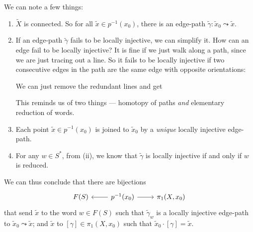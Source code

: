 \documentclass[a4paper]{article}
\begin{document}
We can note a few things:
\begin{enumerate}
  \item $\tilde{X}$ is connected. So for all $\tilde{x} \in p^{-1}(x_0)$, there is an edge-path $\tilde{\gamma}: \tilde{x}_0 \leadsto \tilde{x}$.
  \item If an edge-path $\tilde{\gamma}$ fails to be locally injective, we can simplify it. How can an edge fail to be locally injective? It is fine if we just walk along a path, since we are just tracing out a line. So it fails to be locally injective if two consecutive edges in the path are the same edge with opposite orientations:
    \begin{center}
    \end{center}
    We can just remove the redundant lines and get
    \begin{center}
    \end{center}
    This reminds us of two things --- homotopy of paths \emph{and} elementary reduction of words.
  \item Each point $\tilde{x} \in p^{-1}(x_0)$ is joined to $\tilde{x}_0$ by a \emph{unique} locally injective edge-path.
  \item For any $w \in S^*$, from (ii), we know that $\tilde{\gamma}$ is locally injective if and only if $w$ is reduced.
\end{enumerate}
We can thus conclude that there are bijections
\[
  \begin{tikzcd}
    F(S) & p^{-1}(x_0) \ar[l] \ar [r] & \pi_1(X, x_0)
  \end{tikzcd}
\]
that send $\tilde{x}$ to the word $w \in F(S)$ such that $\tilde{\gamma}_w$ is a locally injective edge-path to $\tilde{x}_0 \leadsto \tilde{x}$; and $\tilde{x}$ to $[\gamma] \in \pi_1(X, x_0)$ such that $\tilde{x}_0 \cdot [\gamma] = \tilde{x}$.
\end{document}
